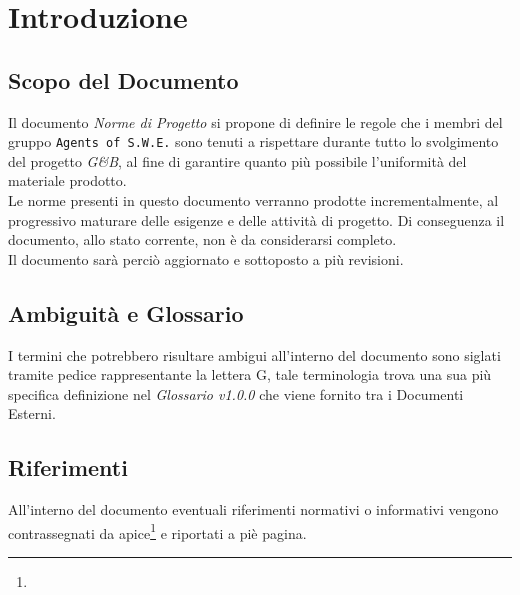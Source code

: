 \section{Introduzione}\label{Intro}

\subsection{Scopo del Documento}
Il documento \textit{Norme di Progetto} si propone di definire le regole che i membri del gruppo \texttt{Agents of S.W.E.} sono tenuti a rispettare durante tutto lo svolgimento del progetto \textit{G\&B}, al fine di garantire quanto più possibile l'uniformità del materiale prodotto.\\
Le norme presenti in questo documento verranno prodotte incrementalmente, al progressivo maturare delle esigenze e delle attività di progetto. Di conseguenza il documento, allo stato corrente, non è da considerarsi completo.\\
Il documento sarà perciò aggiornato e sottoposto a più revisioni.

\subsection{Ambiguità e Glossario}
I termini che potrebbero risultare ambigui all'interno del documento sono siglati tramite pedice rappresentante la lettera \textmd{G}, tale terminologia trova una sua più specifica definizione nel \textit{Glossario v1.0.0} che viene fornito tra i Documenti Esterni.

\subsection{Riferimenti}
All'interno del documento eventuali riferimenti normativi o informativi vengono contrassegnati da apice\footnote{} e riportati a piè pagina.